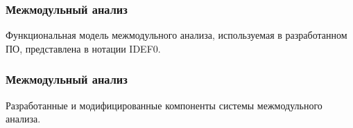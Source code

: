 \documentclass[hyperref={pdfpagelabels=false},10pt,gray]{beamer}
\begin{document}

\begin{frame}
\frametitle{Межмодульный анализ}
Функциональная модель межмодульного анализа, используемая в разработанном ПО, представлена в нотации IDEF0.
\begin{figure}[h]
\end{figure}
\end{frame}

\begin{frame}
\frametitle{Межмодульный анализ}
Разработанные и модифицированные компоненты системы межмодульного анализа.
\begin{figure}[h]
\end{figure}
\end{frame}
\end{document}
